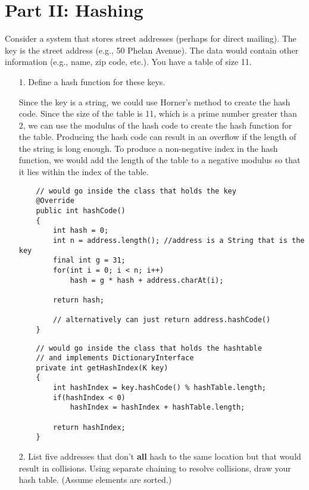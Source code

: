 \documentclass[10pt]{article}
\begin{document}
\section{Part II: Hashing}
Consider a system that stores street addresses (perhaps for direct mailing). The key is the street address (e.g., 50 Phelan Avenue). The data would contain other information (e.g., name, zip code, etc.). You have a table of size 11.
	\begin{enumerate}
		\item[1.] Define a hash function for these keys.
			
			\vspace{0.5cm}
			Since the key is a string, we could use Horner's method to create the hash code. Since the size of the table is 11, which is a prime number greater than 2, we can use the modulus of the hash code to create the hash function for the table. Producing the hash code can result in an overflow if the length of the string is long enough. To produce a non-negative index in the hash function, we would add the length of the table to a negative modulus so that it lies within the index of the table.
			
			\vspace{0.5cm}
			\begin{lstlisting}
    // would go inside the class that holds the key
    @Override
    public int hashCode()
    {
        int hash = 0;
        int n = address.length(); //address is a String that is the key
        final int g = 31;
        for(int i = 0; i < n; i++)
            hash = g * hash + address.charAt(i);

        return hash;

        // alternatively can just return address.hashCode()
    }
			\end{lstlisting}
			
			\vspace{0.5cm}
			\begin{lstlisting}
    // would go inside the class that holds the hashtable
    // and implements DictionaryInterface
    private int getHashIndex(K key)
    {
        int hashIndex = key.hashCode() % hashTable.length;
        if(hashIndex < 0)
            hashIndex = hashIndex + hashTable.length;
    
        return hashIndex;
    }
			\end{lstlisting}
			\vspace{0.5cm}
		
		\item[2.] List five addresses that don't \textbf{all} hash to the same location but that would result in collisions. Using separate chaining to resolve collisions, draw your hash table. (Assume elements are sorted.)
			

\end{enumerate}
\end{document}
